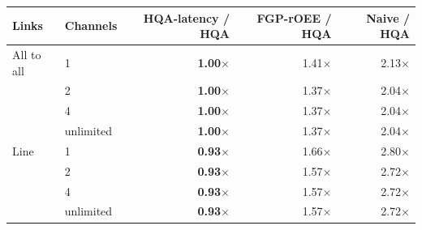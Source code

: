 \begin{tabular}{llrrr}
\toprule
Links & Channels & HQA-latency / HQA & FGP-rOEE / HQA & Naive / HQA \\
\midrule
All to all & 1 & \textbf{1.00$\times$} & 1.41$\times$ & 2.13$\times$ \\
 & 2 & \textbf{1.00$\times$} & 1.37$\times$ & 2.04$\times$ \\
 & 4 & \textbf{1.00$\times$} & 1.37$\times$ & 2.04$\times$ \\
 & unlimited & \textbf{1.00$\times$} & 1.37$\times$ & 2.04$\times$ \\
\midrule
Line & 1 & \textbf{0.93$\times$} & 1.66$\times$ & 2.80$\times$ \\
 & 2 & \textbf{0.93$\times$} & 1.57$\times$ & 2.72$\times$ \\
 & 4 & \textbf{0.93$\times$} & 1.57$\times$ & 2.72$\times$ \\
 & unlimited & \textbf{0.93$\times$} & 1.57$\times$ & 2.72$\times$ \\
\bottomrule
\end{tabular}
